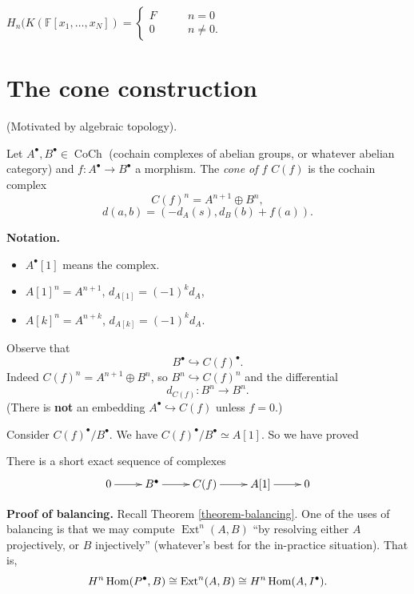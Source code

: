\begin{corollary}
\label{lemma-homology-koszul-polynomials}
$H_n(K(\mathbb{F}[x_1,\dots,x_N])
=
\begin{cases}
F\qquad &n=0 \\
0\qquad &n \neq 0.
\end{cases}$
\end{corollary}


\section{The cone construction}
\label{section-cone-construction}

\noindent
(Motivated by algebraic topology).

\begin{definition}
\label{definition-cone}
Let $A^\bullet,B^\bullet \in
\operatorname{CoCh}$ (cochain complexes
of abelian groups, or whatever abelian
category) and $f: A^\bullet \to B^\bullet$ 
a morphism. The {\it cone of $f$} 
$C(f)$ is the cochain complex
$$
C(f)^n=A^{n+1}\oplus B^n,
$$
$$
d(a,b) = (-d_A(s),d_B(b)+f(a)).
$$
\end{definition}

\noindent
{\bf Notation.} 
\begin{itemize}
\item $A^\bullet[1]$ means the complex.
\item $A[1]^n = A^{n+1}$,
$d_{A[1]}=(-1)^kd_A$,
\item $A[k]^n=A^{n+k}$,
$d_{A[k]}=(-1)^kd_A$.
\end{itemize}

\noindent
Observe that
$$
B^\bullet \hookrightarrow C(f)^\bullet.
$$
Indeed $C(f)^n=A^{n+1}\oplus B^n$,
so $B^n \hookrightarrow C(f)^n$
and the differential
$$
d_{C(f)}:B^n \to B^n.
$$
(There is {\bf not} an embedding
$A^\bullet \hookrightarrow C(f)$
unless $f=0$.)

Consider $C(f)^\bullet/B^\bullet$.
We have $C(f)^\bullet/B^\bullet \simeq
A[1]$.
So we have proved

\begin{proposition}
\label{proposition-ses-complexes-cone}
There is a short exact sequence of complexes
$$
\xymatrix{
0\ar[r]
&B^\bullet\ar[r]
&C(f)\ar[r]
&A[1]\ar[r]
&0
}
$$
\end{proposition}

\medskip\noindent
{\bf Proof of balancing.}
Recall Theorem \ref{theorem-balancing}.
One of the uses of balancing is that
we may compute $\operatorname{Ext}^n(A,B)$
``by resolving either $A$ projectively,
or $B$ injectively'' (whatever's best for
the in-practice situation). That is,
$$
H^n\mathop{\mathrm{Hom}}\nolimits(P^\bullet,B)
\cong
\operatorname{Ext}^n(A,B)
\cong
H^n\mathop{\mathrm{Hom}}\nolimits(A,I^\bullet).
$$

